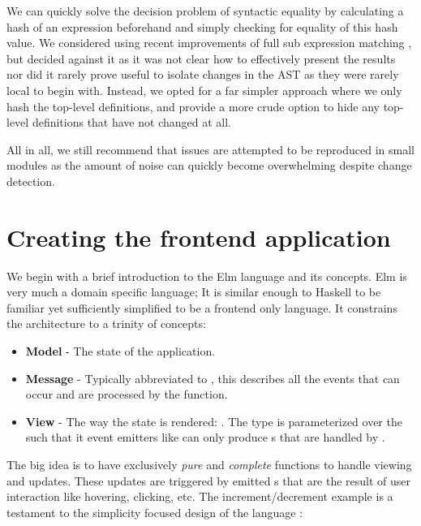 We can quickly solve the decision problem of syntactic equality by calculating a hash of an expression beforehand
and simply checking for equality of this hash value. We considered using recent improvements of full sub expression
matching \cite{hashing_mod_alpha}, but decided against it as it was not clear how to effectively present the results
nor did it rarely prove useful to isolate changes in the AST as they were rarely local to begin with.
Instead, we opted for a far simpler approach where we only hash the top-level definitions, and provide a more crude
option to hide any top-level definitions that have not changed at all.

All in all, we still recommend that issues are attempted to be reproduced in small modules as the amount of
noise can quickly become overwhelming despite change detection.

\section{Creating the frontend application}

We begin with a brief introduction to the Elm language and its concepts. Elm is very much a domain specific language; It is 
similar enough to Haskell to be familiar yet sufficiently simplified to be a frontend only language. It constrains the architecture
to a trinity of concepts: 

\begin{itemize}
  \item \textbf{Model} - The state of the application.
  \item \textbf{Message} - Typically abbreviated to , this describes all the events that can occur and are processed by the  function.
  \item \textbf{View} - The way the state is rendered: . The  type is parameterized over the  
    such that it event emitters like  can only produce s that are handled by .
\end{itemize}

The big idea is to have exclusively \textit{pure} and \textit{complete} functions to handle viewing and updates.
These updates are triggered by emitted s that are the result of user interaction like hovering, clicking, etc.
The increment/decrement example is a testament to the simplicity focused design of the language \cite{elm_lang}:

